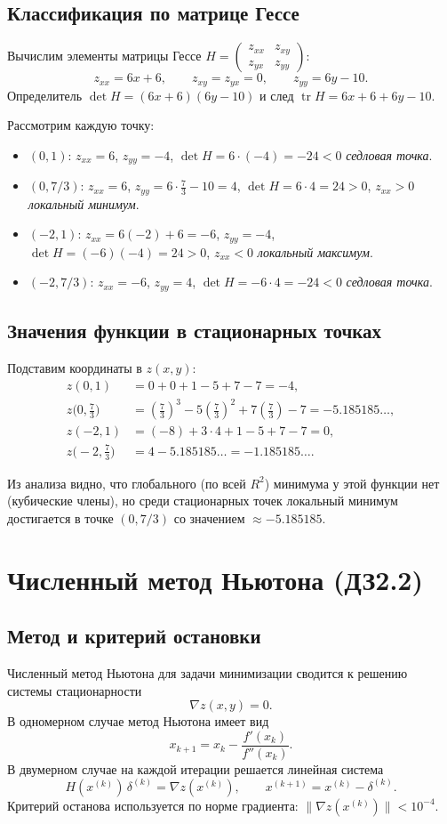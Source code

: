 \documentclass[12pt,a4paper]{article}
\begin{document}
\subsection{Классификация по матрице Гессе}
Вычислим элементы матрицы Гессе $H=\begin{pmatrix} z_{xx} & z_{xy}\\ z_{yx} & z_{yy}\end{pmatrix}$:
\[
z_{xx}=6x+6,\qquad z_{xy}=z_{yx}=0,\qquad z_{yy}=6y-10.
\]
Определитель $\det H=(6x+6)(6y-10)$ и след $\operatorname{tr}H=6x+6+6y-10$.

Рассмотрим каждую точку:
\begin{itemize}
  \item $(0,1)$: $z_{xx}=6$, $z_{yy}=-4$, $\det H=6\cdot(-4)=-24<0$ \textit{седловая точка}.
  \item $(0,7/3)$: $z_{xx}=6$, $z_{yy}=6\cdot\frac{7}{3}-10=4$, $\det H=6\cdot4=24>0$, $z_{xx}>0$ \textit{локальный минимум}.
  \item $(-2,1)$: $z_{xx}=6(-2)+6=-6$, $z_{yy}=-4$, $\det H=(-6)(-4)=24>0$, $z_{xx}<0$ \textit{локальный максимум}.
  \item $(-2,7/3)$: $z_{xx}=-6$, $z_{yy}=4$, $\det H=-6\cdot4=-24<0$ \textit{седловая точка}.
\end{itemize}

\subsection{Значения функции в стационарных точках}
Подставим координаты в $z(x,y)$:
\begin{align*}
z(0,1)&=0+0+1-5+7-7=-4,\\
z\bigl(0,\tfrac{7}{3}\bigr)&=\left(\tfrac{7}{3}\right)^{3}-5\left(\tfrac{7}{3}\right)^{2}+7\left(\tfrac{7}{3}\right)-7=-5.185185\ldots,\\
z(-2,1)&=(-8)+3\cdot4+1-5+7-7=0,\\
z\bigl(-2,\tfrac{7}{3}\bigr)&=4-5.185185\ldots=-1.185185\ldots.
\end{align*}

Из анализа видно, что глобального (по всей $R^{2}$) минимума у этой функции нет (кубические члены), но среди стационарных точек локальный минимум достигается в точке $(0,7/3)$ со значением $\approx -5.185185$.

\section{Численный метод Ньютона (ДЗ2.2)}
\subsection{Метод и критерий остановки}
Численный метод Ньютона для задачи минимизации сводится к решению системы стационарности
\[
\nabla z(x,y)=0.
\]
В одномерном случае метод Ньютона имеет вид
\[
x_{k+1}=x_k-\frac{f'(x_k)}{f''(x_k)}.
\]
В двумерном случае на каждой итерации решается линейная система
\[
H(x^{(k)})\,\delta^{(k)}=\nabla z(x^{(k)}),\qquad x^{(k+1)}=x^{(k)}-\delta^{(k)}.
\]
Критерий останова используется по норме градиента: $\|\nabla z(x^{(k)})\|<10^{-4}$.
\end{document}
